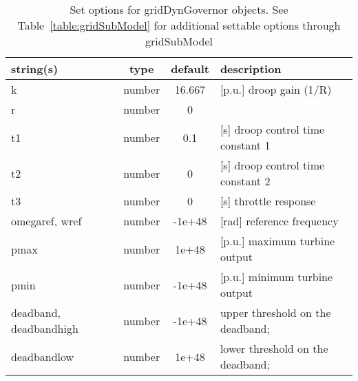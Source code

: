 \begin{table}[ht]
\centering
\begin{tabular}{p{5cm} c c p{7cm}}
\hline
string(s) & type & default & description \\
\hline
k & number & 16.667 & [p.u.] droop gain (1/R)\\
r & number & 0 & \\
t1 & number & 0.1 & [s]   droop control time constant 1\\
t2 & number & 0 & [s]   droop control  time constant 2\\
t3 & number & 0 & [s]  throttle response\\
omegaref, wref & number & -1e+48 & [rad]  reference frequency\\
pmax & number & 1e+48 & [p.u.] maximum turbine output\\
pmin & number & -1e+48 & [p.u.] minimum turbine output\\
deadband, deadbandhigh & number & -1e+48 & upper threshold on the deadband;\\
deadbandlow & number & 1e+48 & lower threshold on the deadband;\\
\hline
\end{tabular}
\caption{Set options for gridDynGovernor objects. See Table~\ref{table:gridSubModel} for additional settable options through gridSubModel}
\label{table:gridDynGovernor}
\end{table}
